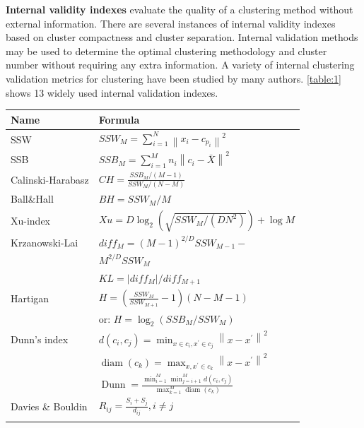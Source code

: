 \documentclass[a4paper, 12pt]{article}
\begin{document}
\textbf{Internal validity indexes} evaluate the quality of a clustering method without external information. There are several instances of internal validity indexes based on cluster compactness and cluster separation. Internal validation methods may be used to determine the optimal clustering methodology and cluster number without requiring any extra information. A variety of internal clustering validation metrics for clustering have been studied by many authors. \autoref{table:1} shows 13 widely used internal validation indexes.  

\begin{tabularx}{\linewidth}{|X|l|}
    \caption{Internal Validation Indexes} \\
    \hline \textbf{Name} & \textbf{Formula} \\
    \hline SSW & $SSW_{M}=\sum_{i=1}^{N}\left\|x_{i}-c_{p_{i}}\right\|^{2}$ \\
    \hline SSB & $SSB_{M}=\sum_{i=1}^{M} n_{i}\left\|c_{i}-\bar{X}\right\|^{2}$ \\
    \hline Calinski-Harabasz \citep{calinski1974dendrite} & $CH=\frac{S S B_{M} /(M-1)}{S S W_{M} /(N-M)}$ \\
    \hline Ball\&Hall \citep{ball1965isodata} & $BH=S S W_{M} / M$ \\
    \hline Xu-index \citep{xu1997bayesian} & $Xu=D \log_{2}\left(\sqrt{S S W_{M} /\left(D N^{2}\right)}\right)+\log M$ \\
    \hline Krzanowski-Lai \citep{krzanowski1988criterion} & ${diff}_{M}=(M-1)^{2 / D} SSW_{M-1}-$ \\ & $M^{2 / D} SSW_{M}$ \\ & $KL=\left|{diff}_{M}\right| / {diff}_{M+1}$ \\
    \hline Hartigan \citep{hartigan1975clustering} & $H=\left(\frac{S S W_{M}}{S S W_{M+1}}-1\right)(N-M-1)$ \\ & or: $H=\log _{2}\left(SSB_{M} / SSW_{M}\right)$ \\
    \hline Dunn's index & $d\left(c_{i}, c_{j}\right)=\min _{x \in c_{i}, x^{\prime} \in c_{j}}\left\|x-x^{\prime}\right\|^{2}$ \\ &
    $\operatorname{diam}\left(c_{k}\right)=\max _{x, x^{\prime} \in c_{k}}\left\|x-x^{\prime}\right\|^{2}$ \\ &
    $\operatorname{Dunn}=\frac{\min _{i=1}^{M} \min _{j=i+1}^{M} d\left(c_{i}, c_{j}\right)}{\max _{k=1}^{M} \operatorname{diam}\left(c_{k}\right)}$ \\
    \hline Davies \& Bouldin & $R_{i j}=\frac{S_{i}+S_{j}}{d_{i j}}, i \neq j$ \\ &

\end{tabularx}
\end{document}
